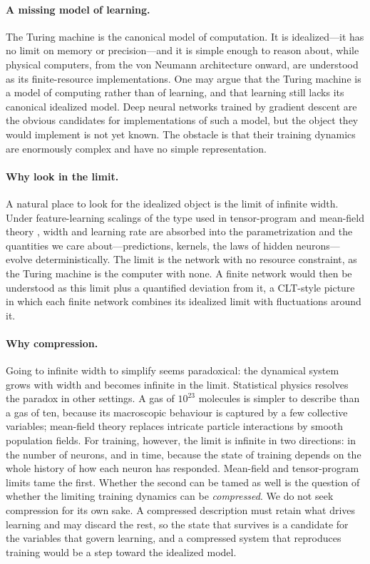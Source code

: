 \documentclass[11pt]{article}
\theoremstyle{definition}
\theoremstyle{remark}
\begin{document}
\paragraph{A missing model of learning.}
The Turing machine is the canonical model of computation.  It is idealized---it
has no limit on memory or precision---and it is simple enough to reason about,
while physical computers, from the von Neumann architecture onward, are
understood as its finite-resource implementations.  One may argue that the Turing
machine is a model of computing rather than of learning, and that learning still
lacks its canonical idealized model.  Deep neural networks trained by gradient
descent are the obvious candidates for implementations of such a model, but the
object they would implement is not yet known.  The obstacle is that their
training dynamics are enormously complex and have no simple representation.

\paragraph{Why look in the limit.}
A natural place to look for the idealized object is the limit of infinite width.
Under feature-learning scalings of the type used in tensor-program and mean-field
theory \citep{yang2021tensor,nguyen2023rigorous}, width and learning rate are
absorbed into the parametrization and the quantities we care about---predictions,
kernels, the laws of hidden neurons---evolve deterministically.  The limit is the
network with no resource constraint, as the Turing machine is the computer with
none.  A finite network would then be understood as this limit plus a quantified
deviation from it, a CLT-style picture in which each finite network combines its
idealized limit with fluctuations around it.

\paragraph{Why compression.}
Going to infinite width to simplify seems paradoxical: the dynamical system grows
with width and becomes infinite in the limit.  Statistical physics resolves the
paradox in other settings.  A gas of $10^{23}$ molecules is simpler to describe
than a gas of ten, because its macroscopic behaviour is captured by a few
collective variables; mean-field theory replaces intricate particle interactions
by smooth population fields.  For training, however, the limit is infinite in
two directions: in the number of neurons, and in time, because the state of
training depends on the whole history of how each neuron has responded.
Mean-field and tensor-program limits tame the first.  Whether the second can be
tamed as well is the question of whether the limiting training dynamics can be
\emph{compressed}.  We do not seek compression for its own sake.  A compressed
description must retain what drives learning and may discard the rest, so the
state that survives is a candidate for the variables that govern learning, and
a compressed system that reproduces training would be a step toward the
idealized model.
\end{document}
